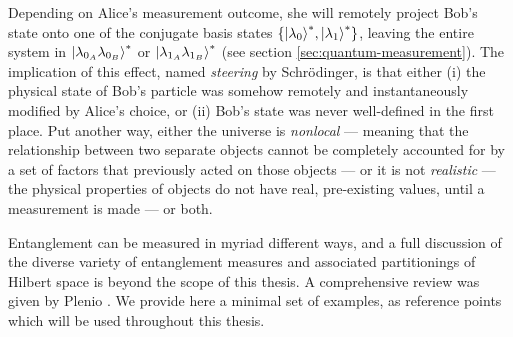 Depending on Alice's measurement outcome, she will remotely project Bob's state onto one of the conjugate basis states $\{ \mbox{$ | \lambda_0 \rangle $}^*, \mbox{$ | \lambda_1 \rangle $}^*\}$, leaving the entire system in $\mbox{$ | \lambda_{0_A} \lambda_{0_B} \rangle $}^*$ or $\mbox{$ | \lambda_{1_A} \lambda_{1_B} \rangle $}^*$ (see section \ref{sec:quantum-measurement}). The implication of this effect, named \emph{steering} by Schr\"odinger, is that either (i) the physical state of Bob's particle was somehow remotely and instantaneously modified by Alice's choice, or (ii) Bob's state was never well-defined in the first place. Put another way, either the universe is \emph{nonlocal} --- meaning that the relationship between two separate objects cannot be completely accounted for by a set of factors that previously acted on those objects --- or it is not \emph{realistic} --- the physical properties of objects do not have real, pre-existing values, until a measurement is made --- or both. 

Entanglement can be measured in myriad different ways, and a full discussion of the diverse variety of entanglement measures and associated partitionings of Hilbert space is beyond the scope of this thesis. 
A comprehensive review was given by Plenio \cite{Plenio2006}. 
We provide here a minimal set of examples, as reference points which will be used throughout this thesis.

